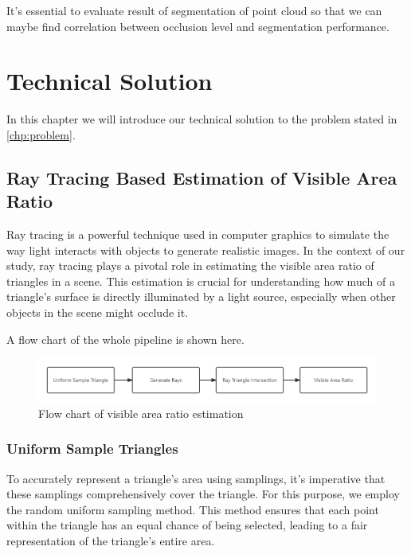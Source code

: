 \documentclass[11pt, a4paper,oneside,chapterprefix=false]{scrbook}
\begin{document}
It's essential to evaluate result of segmentation of point cloud so that we can maybe find correlation between occlusion level and segmentation performance.

\chapter{Technical Solution} \label{chp:solution}

In this chapter we will introduce our technical solution to the problem stated in \ref{chp:problem}.

\section{Ray Tracing Based Estimation of Visible Area Ratio} \label{sec:ray tracing visible area ratio}

Ray tracing is a powerful technique used in computer graphics to simulate the way light interacts with objects to generate realistic images. In the context of our study, ray tracing plays a pivotal role in estimating the visible area ratio of triangles in a scene. This estimation is crucial for understanding how much of a triangle's surface is directly illuminated by a light source, especially when other objects in the scene might occlude it.

A flow chart of the whole pipeline is shown here.

\begin{minipage}{\textwidth}
	\begin{figure}[H]
		\centering
		\includegraphics*[width=1.0\textwidth]{figures/visible area.png}
		\caption{Flow chart of visible area ratio estimation}
		\label{fig:visible area ratio estimation}
	\end{figure}
\end{minipage}

\subsection{Uniform Sample Triangles}

To accurately represent a triangle's area using samplings, it's imperative that these samplings comprehensively cover the triangle. For this purpose, we employ the random uniform sampling method. This method ensures that each point within the triangle has an equal chance of being selected, leading to a fair representation of the triangle's entire area.
\end{document}
